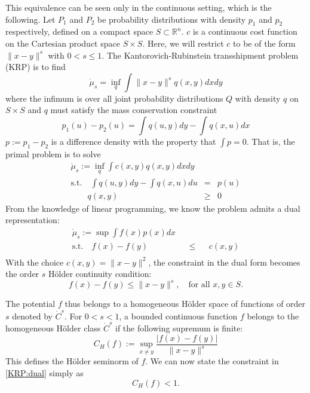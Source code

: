 \documentclass[12pt, reqno]{amsart}
\begin{document}
This equivalence can be seen only in the continuous setting, which is the following. Let $P_1$ and $P_2$ be probability distributions with density $p_1$ and $p_2$ respectively, defined on a compact space $S\subset \mathbb{R}^n$. $c$ is a continuous cost function on the Cartesian product space $S\times S$. Here, we will restrict $c$ to be of the form $\|x-y\|^s$ with $0 < s \leq 1$. The Kantorovich-Rubinstein transshipment problem (KRP) is to find
\begin{equation}
	\dot{\mu}_s =\inf_q \int \|x-y\|^s q(x,y) dx dy
\end{equation}
where the infimum is over all joint probability distributions $Q$ with density $q$ on $S\times S$ and $q$ must satisfy the mass conservation constraint
\begin{equation}
	p_1(u) - p_2(u) = \int q(u,y)dy - \int q(x,u)dx
\end{equation}
$p:=p_1-p_2$ is a difference density with the property that $\int p=0$.  That is, the primal problem is to solve
\begin{equation}
\begin{aligned}
	\dot{\mu}_s:=\inf_q \int c(x,y)q(x,y)dxdy  &&\\
\textrm{s.t.}\quad \int q(u,y)dy - \int q(x,u)du &=& p(u) \\
\quad \quad q(x,y)&\geq& 0
\end{aligned}
\end{equation}
From the knowledge of linear programming, we know the problem admits a dual representation:
\begin{equation}
\label{KRP:dual}
	\begin{aligned}
	\dot{\mu}_s:=\sup\int f(x)p(x)dx &&\\
	\textrm{s.t.} \quad f(x)-f(y)&&\leq &&c(x,y)\\
\end{aligned}
\end{equation}
With the choice $c(x,y)=\|x-y\|^2$, the constraint in the dual form becomes the order $s$ H\"{o}lder continuity condition:
\begin{equation}
	f(x)-f(y)\leq \|x-y\|^s,\quad\textrm{for all } x,y\in S.
\end{equation}

The potential $f$ thus belongs to a homogeneous H\"{o}lder space of functions of order $s$ denoted by $\dot{C}^{s}$.  For $0<s<1$, a bounded continuous function $f$ belongs to the homogeneous H\"{o}lder class $\dot{C}^s$ if the following supremum is finite:
\begin{equation}
	C_H(f):=\sup_{x\neq y} \frac{|f(x)-f(y)|}{\|x-y\|^s}
\end{equation}
This defines the H\"{o}lder seminorm of $f$. We can now state the constraint in \eqref{KRP:dual} simply as
\begin{equation}
	C_H(f) < 1.
\end{equation}
\end{document}

